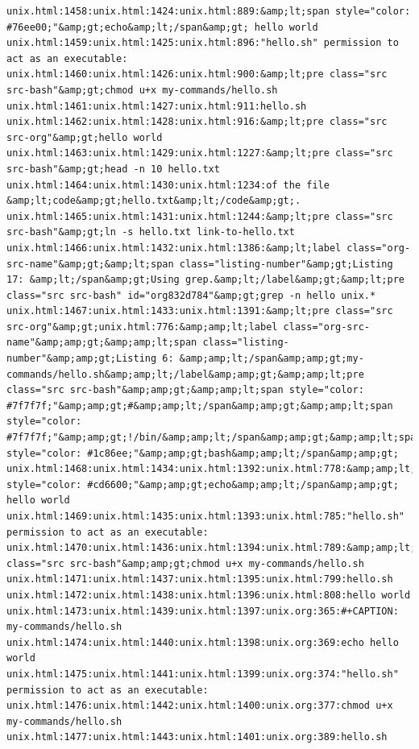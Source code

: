 \documentclass[11pt]{article}
\begin{document}
\begin{verbatim}
unix.html:1458:unix.html:1424:unix.html:889:&amp;lt;span style="color: #76ee00;"&amp;gt;echo&amp;lt;/span&amp;gt; hello world
unix.html:1459:unix.html:1425:unix.html:896:"hello.sh" permission to act as an executable:
unix.html:1460:unix.html:1426:unix.html:900:&amp;lt;pre class="src src-bash"&amp;gt;chmod u+x my-commands/hello.sh
unix.html:1461:unix.html:1427:unix.html:911:hello.sh
unix.html:1462:unix.html:1428:unix.html:916:&amp;lt;pre class="src src-org"&amp;gt;hello world
unix.html:1463:unix.html:1429:unix.html:1227:&amp;lt;pre class="src src-bash"&amp;gt;head -n 10 hello.txt
unix.html:1464:unix.html:1430:unix.html:1234:of the file &amp;lt;code&amp;gt;hello.txt&amp;lt;/code&amp;gt;.
unix.html:1465:unix.html:1431:unix.html:1244:&amp;lt;pre class="src src-bash"&amp;gt;ln -s hello.txt link-to-hello.txt
unix.html:1466:unix.html:1432:unix.html:1386:&amp;lt;label class="org-src-name"&amp;gt;&amp;lt;span class="listing-number"&amp;gt;Listing 17: &amp;lt;/span&amp;gt;Using grep.&amp;lt;/label&amp;gt;&amp;lt;pre class="src src-bash" id="org832d784"&amp;gt;grep -n hello unix.*
unix.html:1467:unix.html:1433:unix.html:1391:&amp;lt;pre class="src src-org"&amp;gt;unix.html:776:&amp;amp;lt;label class="org-src-name"&amp;amp;gt;&amp;amp;lt;span class="listing-number"&amp;amp;gt;Listing 6: &amp;amp;lt;/span&amp;amp;gt;my-commands/hello.sh&amp;amp;lt;/label&amp;amp;gt;&amp;amp;lt;pre class="src src-bash"&amp;amp;gt;&amp;amp;lt;span style="color: #7f7f7f;"&amp;amp;gt;#&amp;amp;lt;/span&amp;amp;gt;&amp;amp;lt;span style="color: #7f7f7f;"&amp;amp;gt;!/bin/&amp;amp;lt;/span&amp;amp;gt;&amp;amp;lt;span style="color: #1c86ee;"&amp;amp;gt;bash&amp;amp;lt;/span&amp;amp;gt;
unix.html:1468:unix.html:1434:unix.html:1392:unix.html:778:&amp;amp;lt;span style="color: #cd6600;"&amp;amp;gt;echo&amp;amp;lt;/span&amp;amp;gt; hello world
unix.html:1469:unix.html:1435:unix.html:1393:unix.html:785:"hello.sh" permission to act as an executable:
unix.html:1470:unix.html:1436:unix.html:1394:unix.html:789:&amp;amp;lt;pre class="src src-bash"&amp;amp;gt;chmod u+x my-commands/hello.sh
unix.html:1471:unix.html:1437:unix.html:1395:unix.html:799:hello.sh
unix.html:1472:unix.html:1438:unix.html:1396:unix.html:808:hello world
unix.html:1473:unix.html:1439:unix.html:1397:unix.org:365:#+CAPTION: my-commands/hello.sh
unix.html:1474:unix.html:1440:unix.html:1398:unix.org:369:echo hello world
unix.html:1475:unix.html:1441:unix.html:1399:unix.org:374:"hello.sh" permission to act as an executable:
unix.html:1476:unix.html:1442:unix.html:1400:unix.org:377:chmod u+x my-commands/hello.sh
unix.html:1477:unix.html:1443:unix.html:1401:unix.org:389:hello.sh

\end{verbatim}
\end{document}
